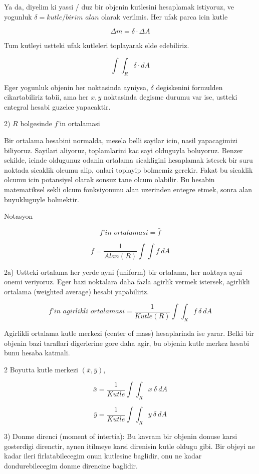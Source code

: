 \documentclass[12pt,fleqn]{article}
\begin{document}
Ya da, diyelim ki yassi / duz bir objenin kutlesini hesaplamak istiyoruz,
ve yogunluk $\delta = kutle / \textit{birim alan}$ olarak verilmis. Her
ufak parca icin kutle

\[ \Delta m = \delta \cdot \Delta A \]

Tum kutleyi ustteki ufak kutleleri toplayarak elde edebiliriz. 

\[ \int \int_R \delta \cdot dA \]

Eger yogunluk objenin her noktasinda ayniysa, $\delta$ degiskenini
formulden cikartabiliriz tabii, ama her $x,y$ noktasinda degisme durumu var
ise, ustteki entegral hesabi guzelce yapacaktir.

2) $R$ bolgesinde $f$'in ortalamasi 

Bir ortalama hesabini normalda, mesela belli sayilar icin, nasil
yapacagimizi biliyoruz. Sayilari aliyoruz, toplamlarini kac sayi olduguyla
boluyoruz. Benzer sekilde, icinde oldugunuz odanin ortalama sicakligini
hesaplamak istesek bir suru noktada sicaklik olcumu alip, onlari toplayip
bolmemiz gerekir. Fakat bu sicaklik olcumu icin potansiyel olarak sonsuz
tane olcum olabilir. Bu hesabin matematiksel sekli olcum fonksiyonunu alan
uzerinden entegre etmek, sonra alan buyukluguyle bolmektir. 

Notasyon

\[ \textit{f'in ortalamasi} = \bar{f} \]

\[ \bar{f} = \frac{1}{Alan(R)} \int \int f \ dA \]

2a) Ustteki ortalama her yerde ayni (uniform) bir ortalama, her noktaya
ayni onemi veriyoruz. Eger bazi noktalara daha fazla agirlik vermek
istersek, agirlikli ortalama (weighted average) hesabi yapabiliriz.

\[ \textit{f'in agirlikli ortalamasi} = \frac{1}{Kutle(R)} 
\int \int_R f \ \delta \ dA
 \]

Agirlikli ortalama kutle merkezi (center of mass) hesaplarinda ise
yarar. Belki bir objenin bazi taraflari digerlerine gore daha agir, bu
objenin kutle merkez hesabi bunu hesaba katmali. 

2 Boyutta kutle merkezi $(\bar{x},\bar{y})$, 

\[  \bar{x}  = \frac{1}{Kutle} \int \int_R x \ \delta \ dA  \]

\[  \bar{y}  = \frac{1}{Kutle} \int \int_R y \ \delta \ dA  \]


3) Donme direnci (moment of intertia): Bu kavram bir objenin donuse
karsi gosterdigi direnctir, aynen itilmeye karsi direnisin kutle oldugu
gibi. Bir objeyi ne kadar ileri firlatabilecegim onun kutlesine baglidir,
onu ne kadar dondurebilecegim donme direncine baglidir. 
\end{document}
